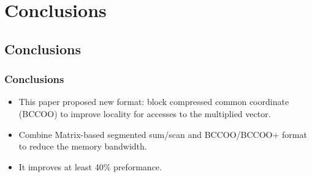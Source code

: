 \section{Conclusions}

\subsection{Conclusions}
\begin{frame}
	\frametitle{Conclusions}
	\begin{itemize}
		\item This paper proposed new format: block compressed common coordinate
			(BCCOO) to improve locality for accesses to the multiplied vector.
		\item Combine Matrix-based segmented sum/scan and BCCOO/BCCOO+ format to
			reduce the memory bandwidth.
		\item It improves at least 40\% preformance.
	\end{itemize}
\end{frame}